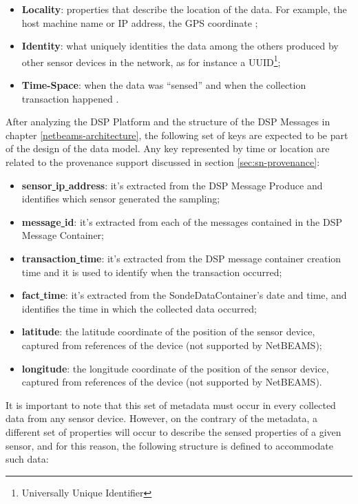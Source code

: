 \begin{itemize}
  \item \textbf{Locality}: properties that describe the location of the data.
  For example, the host machine name or IP address, the GPS coordinate
  \cite{gps};
  \item \textbf{Identity}: what uniquely identities the data among the others
  produced by other sensor devices in the network, as for instance a
  UUID\footnote{Universally Unique Identifier};
  \item \textbf{Time-Space}: when the data was ``sensed'' \cite{db-provenance}
  and when the collection transaction happened \cite{sn-time-series}.
\end{itemize}

After analyzing the DSP Platform and the structure of the DSP Messages in
chapter \ref{netbeams-architecture}, the following set of keys are expected to
be part of the design of the data model. Any key represented by time or
location are related to the provenance support discussed in section
\ref{sec:sn-provenance}:

\begin{itemize}
  \item \textbf{sensor\underline{ }ip\underline{ }address}: it's extracted from
  the DSP Message Produce and identifies which sensor generated the sampling;
  \item \textbf{message\underline{ }id}: it's extracted from each of the messages contained
  in the DSP Message Container;
  \item \textbf{transaction\underline{ }time}: it's extracted from the DSP message container
  creation time and it is used to identify when the transaction occurred;
  \item \textbf{fact\underline{ }time}: it's extracted from the SondeDataContainer's date
  and time, and identifies the time in which the collected data occurred;
  \item \textbf{latitude}: the latitude coordinate of the position of
  the sensor device, captured from references of the device (not supported by
  NetBEAMS);
  \item \textbf{longitude}: the longitude coordinate of the position of the
  sensor device, captured from references of the device (not supported by
  NetBEAMS).
\end{itemize}

It is important to note that this set of metadata must occur in every
collected data from any sensor device. However, on the contrary of the
metadata, a different set of properties will occur to describe the sensed
properties of a given sensor, and for this reason, the following structure is
defined to accommodate such data:


